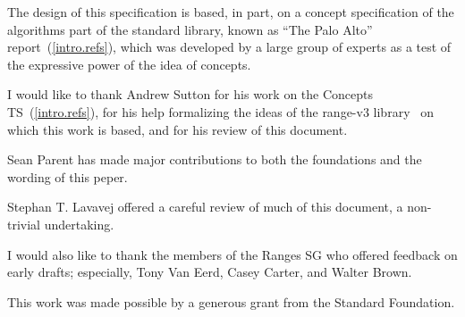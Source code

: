 \setcounter{chapter}{0}

The design of this specification is based, in part, on a concept
specification of the algorithms part of the \Cpp standard library, known
as ``The Palo Alto'' report~(\ref{intro.refs}), which was developed by a large
group of experts as a test of the expressive power of the idea of
concepts.

I would like to thank Andrew Sutton for his work on the Concepts TS~(\ref{intro.refs}),
for his help formalizing the ideas of the range-v3 library~\cite{range-v3} on which this
work is based, and for his review of this document.

Sean Parent has made major contributions to both the foundations and the wording of this
peper.

Stephan T. Lavavej offered a careful review of much of this document, a non-trivial undertaking.

I would also like to thank the members of the Ranges SG who offered feedback on early drafts;
especially, Tony Van Eerd, Casey Carter, and Walter Brown.

This work was made possible by a generous grant from the Standard \Cpp Foundation.
